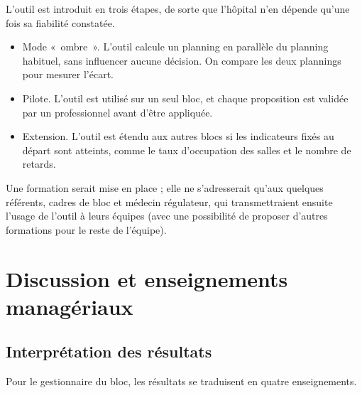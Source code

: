 \documentclass[11pt,a4paper]{article}
\begin{document}
L'outil est introduit en trois étapes, de sorte que l'hôpital n'en dépende qu'une fois sa fiabilité constatée.
\begin{itemize}
\item Mode «~ombre~». L'outil calcule un planning en parallèle du planning habituel, sans influencer aucune décision. On compare les deux plannings pour mesurer l'écart.
\item Pilote. L'outil est utilisé sur un seul bloc, et chaque proposition est validée par un professionnel avant d'être appliquée.
\item Extension. L'outil est étendu aux autres blocs si les indicateurs fixés au départ sont atteints, comme le taux d'occupation des salles et le nombre de retards.
\end{itemize}
Une formation serait mise en place ; elle ne s'adresserait qu'aux quelques référents, cadres de bloc et médecin régulateur, qui transmettraient ensuite l'usage de l'outil à leurs équipes (avec une possibilité de proposer d'autres formations pour le reste de l'équipe).

\section{Discussion et enseignements managériaux}
\label{sec:discussion}

\subsection{Interprétation des résultats}

Pour le gestionnaire du bloc, les résultats se traduisent en quatre enseignements.
\end{document}

